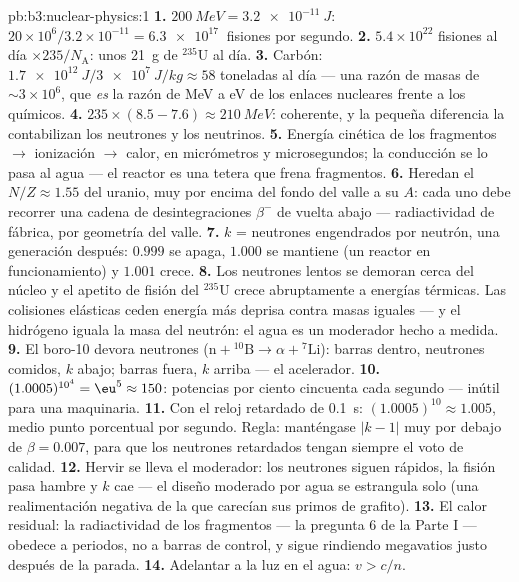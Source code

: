 \begin{solution}{pb:b3:nuclear-physics:1}
\textbf{1.} $\qty{200}{MeV} = \qty{3.2e-11}{J}$:
$20\times10^6/3.2\times10^{-11} = \qty{6.3e17}{}$ fisiones por
segundo.
\textbf{2.} $5.4\times10^{22}$ fisiones al día $\times
235/N_{\text{A}}$: unos \qty{21}{g} de $^{235}$U al día.
\textbf{3.} Carbón: $\qty{1.7e12}{J}/\qty{3e7}{J/kg} \approx 58$
toneladas al día --- una razón de masas de $\sim3\times10^{6}$, que
\emph{es} la razón de \unit{MeV} a \unit{eV} de los enlaces nucleares frente a los
químicos.
\textbf{4.} $235\times(8.5 - 7.6) \approx \qty{210}{MeV}$:
coherente, y la pequeña diferencia la contabilizan los neutrones y los
neutrinos.
\textbf{5.} Energía cinética de los fragmentos $\to$ ionización $\to$ calor,
en micrómetros y microsegundos; la conducción se lo pasa al
agua --- el reactor es una tetera que frena fragmentos.
\textbf{6.} Heredan el $N/Z \approx 1.55$ del uranio, muy
por encima del fondo del valle a su $A$: cada uno debe recorrer una cadena de
desintegraciones $\beta^-$ de vuelta abajo --- radiactividad de fábrica, por
geometría del valle.
\textbf{7.} $k$ = neutrones engendrados por neutrón, una generación
después: $0.999$ se apaga, $1.000$ se mantiene (un reactor en
funcionamiento) y $1.001$ crece.
\textbf{8.} Los neutrones lentos se demoran cerca del núcleo y el
apetito de fisión del $^{235}$U crece abruptamente a energías térmicas.
Las colisiones elásticas ceden energía más deprisa contra masas iguales ---
y el hidrógeno iguala la masa del neutrón: el agua es un moderador
hecho a medida.
\textbf{9.} El boro-10 devora neutrones ($\text{n} + {}^{10}
\text{B} \to \alpha + {}^{7}\text{Li}$): barras dentro, neutrones
comidos, $k$ abajo; barras fuera, $k$ arriba --- el acelerador.
\textbf{10.} $(1.0005)^{10^4} = \eu^{5} \approx 150$: potencias
por ciento cincuenta cada segundo --- inútil para una maquinaria.
\textbf{11.} Con el reloj retardado de \qty{0.1}{s}:
$(1.0005)^{10} \approx 1.005$, medio punto porcentual por segundo. Regla:
manténgase $|k - 1|$ muy por debajo de $\beta = 0.007$, para que los
neutrones retardados tengan siempre el voto de calidad.
\textbf{12.} Hervir se lleva el moderador: los neutrones siguen rápidos,
la fisión pasa hambre y $k$ cae --- el diseño moderado por agua
se estrangula solo (una realimentación negativa de la que carecían sus primos
de grafito).
\textbf{13.} El calor residual: la radiactividad de los fragmentos ---
la pregunta 6 de la Parte I --- obedece a periodos, no a barras de control, y
sigue rindiendo megavatios justo después de la parada.
\textbf{14.} Adelantar a la luz en el agua: $v > c/n$.

\end{solution}

